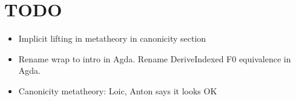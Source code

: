 \documentclass[acmsmall,screen,review,anonymous]{acmart}
\newcommand{\msf}[1]{{\mathsf{#1}}}
\newcommand{\U}{\msf{U}}
\newcommand{\Sig}{\msf{Sig}}
\newcommand{\w}{\circ}
\begin{document}





































\section{TODO}


\begin{itemize}
  \item Implicit lifting in metatheory in canonicity section
  \item Rename wrap to intro in Agda. Rename DeriveIndexed F0 equivalence in Agda.
  \item Canonicity metatheory: Loic, Anton says it looks OK

\end{itemize}



\end{document}
